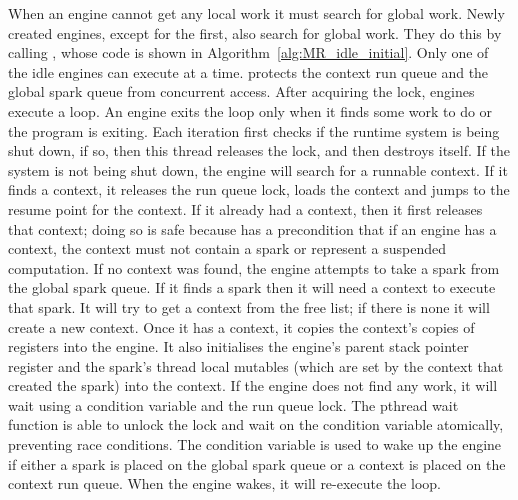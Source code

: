 When an engine cannot get any local work it must search for global work.
Newly created engines, except for the first, also search for global work.
They do this by calling \idle,
whose code is shown in Algorithm~\ref{alg:MR_idle_initial}.
Only one of the idle engines can execute \idle at a time.
 protects the context run queue and the
global spark queue from concurrent access.
After acquiring the lock,
engines execute a loop.
An engine exits the loop only when it finds some work to do or the
program is exiting.
Each iteration first checks if the runtime system is being shut down,
if so,
then this thread releases the lock,
and then destroys itself.
If the system is not being shut down,
the engine will search for a runnable context.
If it finds a context, it releases the run queue lock, loads the context
and jumps to the resume point for the context.
If it already had a context, then it first releases that context;
doing so is safe because \idle has a precondition that if an engine has a
context,
the context must not contain a spark or represent a suspended computation.
If no context was found, the engine attempts to take a spark from the global
spark queue.
If it finds a spark then it will need a context to execute that spark.
It will try to get a context from the free list;
if there is none it will create a new context.
Once it has a context,
it copies the context's copies of registers into the engine.
It also initialises the engine's parent stack pointer
register and the spark's thread local mutables
(which are set by the context that created the spark)
into the context.
If the engine does not find any work,
it will wait using a condition variable and the run queue lock.
The pthread wait function is able to unlock the lock and wait on the
condition variable atomically, preventing race conditions.
The condition variable is used to wake up the engine if either a spark is
placed on the global spark queue or a context is placed on the context run
queue.
When the engine wakes,
it will re-execute the loop.

